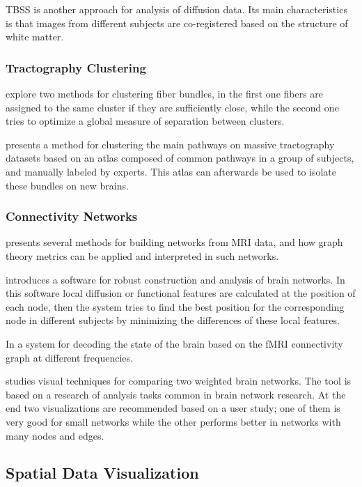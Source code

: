 TBSS \autocite{smith_tract-based_2006} is another approach for analysis of diffusion data. Its main characteristics is that images from different subjects are co-registered based on the structure of white matter. 

\subsubsection{Tractography Clustering}

\autocite{song_zhang_identifying_2008} explore two methods for clustering fiber bundles, in the first one fibers are assigned to the same cluster if they are sufficiently close, while the second one tries to optimize a global measure of separation between clusters.

\autocite{guevara_automatic_2012} presents a method for clustering the main pathways on massive tractography datasets based on an atlas composed of common pathways in a group of subjects, and manually labeled by experts. This atlas can afterwards be used to isolate these bundles on new brains.

\subsubsection{Connectivity Networks}

\autocite{rubinov_complex_2010} presents several methods for building networks from MRI data, and how graph theory metrics can be applied and interpreted in such networks.

\autocite{li_visual_2012} introduces a software for robust construction and analysis of brain networks. In this software local diffusion or functional features are calculated at the position of each node, then the system tries to find the best position for the corresponding node in different subjects by minimizing the differences of these local features.

In \autocite{richiardi_decoding_2011} a system for decoding the state of the brain based on the fMRI connectivity graph at different frequencies.

\autocite{alper_weighted_2013} studies visual techniques for comparing two weighted brain networks. The tool is based on a research of analysis tasks common in brain network research. At the end two visualizations are recommended based on a user study; one of them is very good for small networks while the other performs better in networks with many nodes and edges.

\subsection{Spatial Data Visualization}


